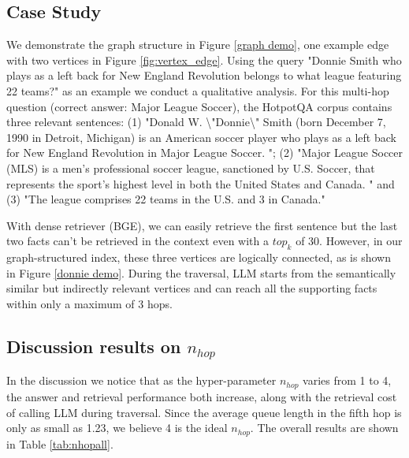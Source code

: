 \subsection{Case Study}
\label{case study}
We demonstrate the graph structure in Figure \ref{graph demo}, one example edge with two vertices in Figure \ref{fig:vertex_edge}. Using the query "Donnie Smith who plays as a left back for New England Revolution belongs to what league featuring 22 teams?" as an example we conduct a qualitative analysis. For this multi-hop question (correct answer: Major League Soccer), the HotpotQA corpus contains three relevant sentences: (1) "Donald W. \textbackslash{}"Donnie\textbackslash{}" Smith (born December 7, 1990 in Detroit, Michigan) is an American soccer player who plays as a left back for New England Revolution in Major League Soccer. "; (2) "Major League Soccer (MLS) is a men's professional soccer league, sanctioned by U.S. Soccer, that represents the sport's highest level in both the United States and Canada. " and (3) "The league comprises 22 teams in the U.S. and 3 in Canada." 

With dense retriever (BGE), we can easily retrieve the first sentence but the last two facts can't be retrieved in the context even with a $top_k$ of 30. However, in our graph-structured index, these three vertices are logically connected, as is shown in Figure \ref{donnie demo}. During the traversal, LLM starts from the semantically similar but indirectly relevant vertices and can reach all the supporting facts within only a maximum of 3 hops.

\subsection{Discussion results on $n_{hop}$}
\label{nhop_ablation}
In the discussion we notice that as the hyper-parameter $n_{hop}$ varies from 1 to 4, the answer and retrieval performance both increase, along with the retrieval cost of calling LLM during traversal. Since the average queue length in the fifth hop is only as small as 1.23, we believe 4 is the ideal $n_{hop}$. The overall results are shown in Table \ref{tab:nhopall}.


